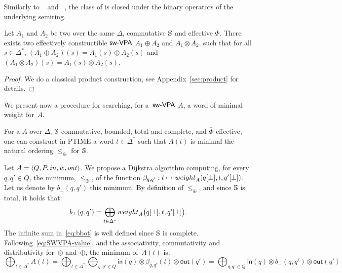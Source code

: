 \medskip\noindent
Similarly to \VPA~\cite{AlurMadhusudan09nested}
and \SVPA~\cite{dAntonyAlur14SVPDA},
the class of \SWVPA is closed under the binary operators of the underlying semiring.
%
\begin{proposition}\label{prop:SWVPA-product}
Let $A_1$ and $A_2$ be two \SWVPA
over the same $\Delta$, commutative $\mathbb{S}$ and effective $\bar\Phi$.
There exists two effectively constructible $\textsf{sw-VPA}$
$A_1 \oplus A_2$ and $A_1 \otimes A_2$,
such that for all $s \in \Delta^*$,
$(A_1 \oplus A_2)(s) = A_1(s) \oplus A_2(s)$ and
$(A_1 \otimes A_2)(s) = A_1(s) \otimes A_2(s)$.
\end{proposition}
%
\begin{proof}
We do a classical product construction, see Appendix~\ref{sec:product} for details.
\end{proof}
\noindent
We present now a procedure for searching, for a~$\textsf{sw-VPA}$ $A$,
a word %
of minimal weight for~$A$.
%
\begin{proposition}\label{th:best-search}
For a \SWVPA $A$
over $\Delta$,
$\mathbb{S}$ commutative, bounded, total and complete, %
and $\bar\Phi$ effective, %
one can construct in PTIME a word $t \in \Delta^*$
such that $A(t)$ is minimal \wrt the natural ordering $\leq_\oplus$ for $\mathbb{S}$.
\end{proposition}
%
Let $A = \< Q, P, \init, \bar\wei, \final >$.
%
We propose a Dijkstra algorithm computing,
for every $q, q' \in Q$,
the minimum, \wrt $\leq_\oplus$, of the function
$\beta_{q, q'} : t \mapsto \weight_A(\config{q}{\bot}, t, \config{q'}{\bot})$.
Let us denote by $b_\bot(q, q')$ this minimum.
By definition of $\leq_\oplus$, and since $\mathbb{S}$ is total,
it holds that:
%
\begin{equation}\label{eq:bbot}
  b_\bot(q, q') = \bigoplus_{t\in \Delta^*}
  \textstyle
  \weight_A\bigl(\config{q}{\bot}, t, \config{q'}{\bot}\bigr).
\end{equation}
The infinite sum in~\eqref{eq:bbot} is well defined since $\mathbb{S}$ is complete.
%
Following~\eqref{eq:SWVPA-value}, and the associativity, commutativity
and distributivity for~$\otimes$ and~$\oplus$, the minimum of~$A(t)$ is:
\begin{equation}\label{eq:min}
{\displaystyle\bigoplus_{t\in \Delta^*}} A(t)
=
{\displaystyle\bigoplus_{t\in \Delta^*}}
{\displaystyle\bigoplus_{q, q' \in Q}} \textstyle
\mathsf{in}(q) \mathop{\otimes}
\beta_{q, q'}(t)
\mathop{\otimes} \mathsf{out}(q')
=
{\displaystyle\bigoplus_{q, q' \in Q}} \textstyle
\mathsf{in}(q) \mathop{\otimes}
b_\bot(q, q')
\mathop{\otimes} \mathsf{out}(q')
\end{equation}

